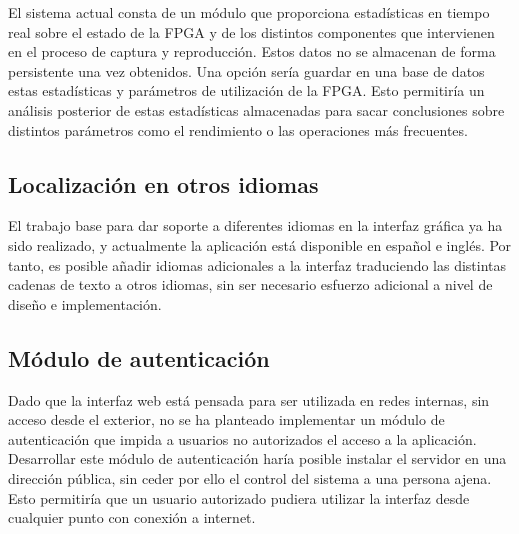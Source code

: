 El sistema actual consta de un módulo que proporciona estadísticas en tiempo real sobre el estado de la \gls{FPGA} y de los distintos componentes que intervienen en el proceso de captura y reproducción. Estos datos no se almacenan de forma persistente una vez obtenidos. Una opción sería guardar en una base de datos estas estadísticas y parámetros de utilización de la \gls{FPGA}. Esto permitiría un análisis posterior de estas estadísticas almacenadas para sacar conclusiones sobre distintos parámetros como el rendimiento o las operaciones más frecuentes.


\subsection*{Localización en otros idiomas}

El trabajo base para dar soporte a diferentes idiomas en la interfaz gráfica ya ha sido realizado, y actualmente la aplicación está disponible en español e inglés. Por tanto, es posible añadir idiomas adicionales a la interfaz traduciendo las distintas cadenas de texto a otros idiomas, sin ser necesario esfuerzo adicional a nivel de diseño e implementación.


\subsection*{Módulo de autenticación}


Dado que la interfaz web está pensada para ser utilizada en redes internas, sin acceso desde el exterior, no se ha planteado implementar un módulo de autenticación que impida a usuarios no autorizados el acceso a la aplicación. Desarrollar este módulo de autenticación haría posible instalar el servidor en una dirección pública, sin ceder por ello el control del sistema a una persona ajena. Esto permitiría que un usuario autorizado pudiera utilizar la interfaz desde cualquier punto con conexión a internet.